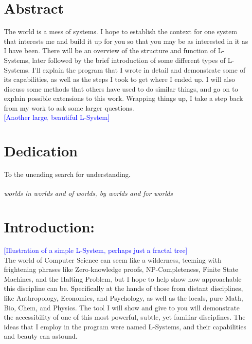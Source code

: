 \documentclass[12pt,twoside]{reedthesis}
\begin{document}
\chapter*{Abstract}
	The world is a mess of systems. I hope to establish the context for one system that interests me and build it up for you so that you may be as interested in it as I have been. There will be an overview of the structure and function of L-Systems, later followed by the brief introduction of some different types of L-Systems. I'll explain the program that I wrote in detail and demonstrate some of its capabilities, as well as the steps I took to get where I ended up. I will also discuss some methods that others have used to do similar things, and go on to explain possible extensions to this work. Wrapping things up, I take a step back from my work to ask some larger questions.\\
	
	\textcolor{blue}{[Another large, beautiful L-System]}
	
\chapter*{Dedication}
	To the unending search for understanding. \\\\
	\textit{worlds in worlds and of worlds, by worlds and for worlds}

  \mainmatter %
  \pagestyle{fancyplain} %

\chapter{Introduction: }
	
\textcolor{blue}{[Illustration of a simple L-System, perhaps just a fractal tree]}\\

The world of Computer Science can seem like a wilderness, teeming with frightening phrases like Zero-knowledge proofs, NP-Completeness, Finite State Machines, and the Halting Problem, but I hope to help show how approachable this discipline can be. Specifically at the hands of those from distant disciplines, like Anthropology, Economics, and Psychology, as well as the locals, pure Math, Bio, Chem, and Physics. The tool I will show and give to you will demonstrate the accessibility of one of this most powerful, subtle, yet familiar disciplines. The ideas that I employ in the program were named L-Systems, and their capabilities and beauty can astound.
	
\end{document}
